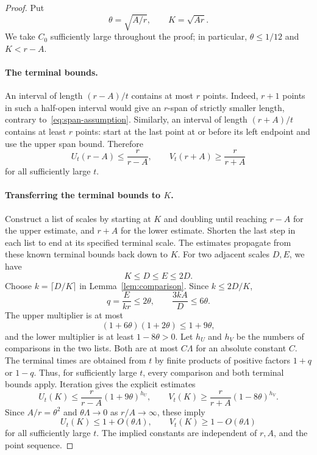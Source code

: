 \documentclass[11pt]{article}
\theoremstyle{remark}
\numberwithin{equation}{section}
\begin{document}
\begin{proof}
Put
\[
  \theta=\sqrt{A/r},
  \qquad
  K=\sqrt{Ar}.
\]
We take $C_0$ sufficiently large throughout the proof; in particular,
$\theta\leq1/12$ and $K<r-A$.
\paragraph{The terminal bounds.}
An interval of length $(r-A)/t$ contains at most $r$ points. Indeed,
$r+1$ points in such a half-open interval would give an $r$-span of
strictly smaller length, contrary to~\eqref{eq:span-assumption}. Similarly,
an interval of length $(r+A)/t$ contains at least $r$ points: start at the
last point at or before its left endpoint and use the upper span bound.
Therefore
\begin{equation}\label{eq:terminal}
  U_t(r-A)\leq\frac r{r-A},
  \qquad
  V_t(r+A)\geq\frac r{r+A}
\end{equation}
for all sufficiently large $t$.
\paragraph{Transferring the terminal bounds to $K$.}
Construct a list of scales by starting at $K$ and doubling until reaching
$r-A$ for the upper estimate, and $r+A$ for the lower estimate. Shorten
the last step in each list to end at its specified terminal scale.
The estimates propagate from these known terminal bounds back down to
$K$. For two adjacent scales $D,E$, we have
\[
  K\leq D\leq E\leq2D.
\]
Choose $k=\lceil D/K\rceil$ in Lemma~\ref{lem:comparison}. Since
$k\leq2D/K$,
\[
  q=\frac{E}{kr}\leq2\theta,
  \qquad
  \frac{3kA}{D}\leq6\theta.
\]
The upper multiplier is at most
\[
  (1+6\theta)(1+2\theta)\leq1+9\theta,
\]
and the lower multiplier is at least $1-8\theta>0$.
Let $h_U$ and $h_V$ be the numbers of comparisons in the two lists. Both
are at most $C\Lambda$ for an absolute constant $C$. The terminal times
are obtained from $t$ by finite products of positive factors $1+q$ or
$1-q$. Thus, for sufficiently large $t$, every comparison and both
terminal bounds apply. Iteration gives the explicit estimates
\[
  U_t(K)\leq\frac r{r-A}(1+9\theta)^{h_U},
  \qquad
  V_t(K)\geq\frac r{r+A}(1-8\theta)^{h_V}.
\]
Since $A/r=\theta^2$ and $\theta\Lambda\to0$ as $r/A\to\infty$, these
imply
\begin{equation}\label{eq:middle}
  U_t(K)\leq1+O(\theta\Lambda),
  \qquad
  V_t(K)\geq1-O(\theta\Lambda)
\end{equation}
for all sufficiently large $t$. The implied constants are independent
of $r,A$, and the point sequence.

\end{proof}
\end{document}
